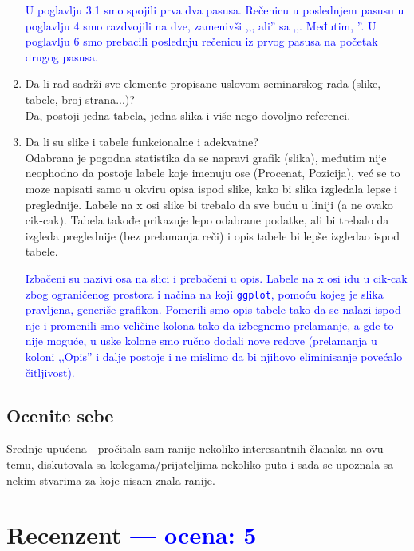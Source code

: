 \documentclass[a4paper]{report}
\newcommand{\odgovor}[1]{\textcolor{blue}{#1}}
\begin{document}
\begin{enumerate}
\odgovor{U poglavlju 3.1 smo spojili prva dva pasusa. Rečenicu u poslednjem pasusu u poglavlju 4 smo razdvojili na dve, zamenivši ,,, ali'' sa ,,. Međutim, ''. U poglavlju 6 smo prebacili poslednju rečenicu iz prvog pasusa na početak drugog pasusa.}
\item Da li rad sadrži sve elemente propisane uslovom seminarskog rada (slike, tabele, broj strana...)?\\
Da, postoji jedna tabela, jedna slika i više nego dovoljno referenci.
\item Da li su slike i tabele funkcionalne i adekvatne?\\
Odabrana je pogodna statistika da se napravi grafik (slika), međutim nije neophodno da postoje labele koje imenuju ose (Procenat, Pozicija), već se to moze napisati samo u okviru opisa ispod slike, kako bi slika izgledala lepse i preglednije. Labele na x osi slike bi trebalo da sve budu u liniji (a ne ovako cik-cak). Tabela takođe prikazuje lepo odabrane podatke, ali bi trebalo da izgleda preglednije (bez prelamanja reči) i opis tabele bi lepše izgledao ispod tabele.

\odgovor{Izbačeni su nazivi osa na slici i prebačeni u opis. Labele na x osi idu u cik-cak zbog ograničenog prostora i načina na koji \texttt{ggplot}, pomoću kojeg je slika pravljena, generiše grafikon. Pomerili smo opis tabele tako da se nalazi ispod nje i promenili smo veličine kolona tako da izbegnemo prelamanje, a gde to nije moguće, u uske kolone smo ručno dodali nove redove (prelamanja u koloni ,,Opis'' i dalje postoje i ne mislimo da bi njihovo eliminisanje povećalo čitljivost).}
\end{enumerate}

\section{Ocenite sebe}
Srednje upućena - pročitala sam ranije nekoliko interesantnih članaka na ovu temu, diskutovala sa kolegama/prijateljima nekoliko puta i sada se upoznala sa nekim stvarima za koje nisam znala ranije.

\chapter{Recenzent \odgovor{--- ocena: 5} }
\end{document}
